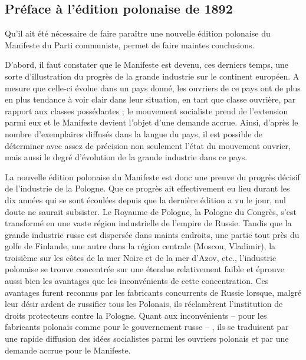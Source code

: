 \documentclass[french,twoside]{book} %
\newcommand{\byline}[1]{\bigskip{\RaggedLeft{#1}\par}\bigskip}
\begin{document}
\byline{Friedrich Engels ; \\
Londres, 1er mai 1890}
\subsection[Préface à l’édition polonaise de 1892]{Préface à l’édition polonaise de 1892}
\noindent Qu'il ait été nécessaire de faire paraître une nouvelle édition polonaise du Manifeste du Parti communiste, permet de faire maintes conclusions.\par
D'abord, il faut constater que le Manifeste est devenu, ces derniers temps, une sorte d’illustration du progrès de la grande industrie sur le continent européen. A mesure que celle-ci évolue dans un pays donné, les ouvriers de ce pays ont de plus en plus tendance à voir clair dans leur situation, en tant que classe ouvrière, par rapport aux classes possédantes ; le mouvement socialiste prend de l’extension parmi eux et le Manifeste devient l’objet d’une demande accrue. Ainsi, d’après le nombre d’exemplaires diffusés dans la langue du pays, il est possible de déterminer avec assez de précision non seulement l’état du mouvement ouvrier, mais aussi le degré d’évolution de la grande industrie dans ce pays.\par
La nouvelle édition polonaise du Manifeste est donc une preuve du progrès décisif de l’industrie de la Pologne. Que ce progrès ait effectivement eu lieu durant les dix années qui se sont écoulées depuis que la dernière édition a vu le jour, nul doute ne saurait subsister. Le Royaume de Pologne, la Pologne du Congrès, s’est transformé en une vaste région industrielle de l’empire de Russie. Tandis que la grande industrie russe est dispersée dans maints endroits, une partie tout près du golfe de Finlande, une autre dans la région centrale (Moscou, Vladimir), la troisième sur les côtes de la mer Noire et de la mer d’Azov, etc., l’industrie polonaise se trouve concentrée sur une étendue relativement faible et éprouve aussi bien les avantages que les inconvénients de cette concentration. Ces avantages furent reconnus par les fabricants concurrents de Russie lorsque, malgré leur désir ardent de russifier tous les Polonais, ils réclamèrent l’institution de droits protecteurs contre la Pologne. Quant aux inconvénients – pour les fabricants polonais comme pour le gouvernement russe – , ils se traduisent par une rapide diffusion des idées socialistes parmi les ouvriers polonais et par une demande accrue pour le Manifeste.\par
\end{document}
